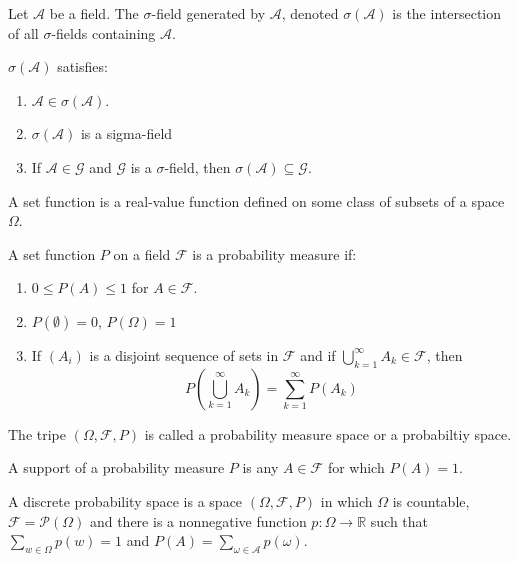 \documentclass[11pt]{article}
\newcommand{\R}{\mathbb{R}}
\newcommand{\F}{\mathcal{F}}
\newcommand{\A}{\mathcal{A}}
\newcommand{\seq}{\subseteq}
\newcommand{\es}{\emptyset}
\newcommand{\mc}{\mathcal}
\newenvironment{definition}[2][Definition]{\begin{trivlist}
\item[\hskip \labelsep {\bfseries #1}\hskip \labelsep {\bfseries #2.}]}{\end{trivlist}}
\newenvironment{rmrk}[2][Remark]{\begin{trivlist}
\item[\hskip \labelsep {\bfseries #1}\hskip \labelsep {\bfseries #2.}]}{\end{trivlist}}
\begin{document}
\begin{definition}{2}
    Let $\mc A$ be a field. The $\sigma$-field generated by $\mc A$, denoted $\sigma (\mc A)$ is the intersection of all $\sigma$-fields containing $\mc A$.
\end{definition}

\begin{rmrk}{3}
    $\sigma(\A)$ satisfies:
    \begin{enumerate}
        \item $\A \in \sigma(\A)$.
        \item $\sigma(\A)$ is a sigma-field
        \item If $\A \in \mc G$ and $\mc G$ is a $\sigma$-field, then $\sigma(\A) \seq \mc G$.
    \end{enumerate}
\end{rmrk}


\begin{definition}{4}
    A set function is a real-value function defined on some class of subsets of a space $\Omega$.
\end{definition}

\begin{definition}{5}
    A set function $P$ on a field $\F$ is a probability measure if:
    \begin{enumerate}
        \item $0 \leq P(A) \leq 1$ for $A \in \mc F$.
        \item $P(\es) = 0$, $P(\Omega) = 1$
        \item If $(A_i)$ is a disjoint sequence of sets in $\F$ and if $\bigcup_{k=1}^{\infty} A_k \in \F$, then
        \[ P \left ( \bigcup_{k=1}^{\infty} A_k \right) = \sum_{k=1}^{\infty} P(A_k) \]
    \end{enumerate}
    The tripe $(\Omega, \F, P)$ is called a probability measure space or a probabiltiy space.
\end{definition}

\begin{definition}{6}
    A support of a probability measure $P$ is any $A \in \F$ for which $P(A) = 1$.
\end{definition}

\begin{definition}{9}
    A discrete probability space is a space $(\Omega, \F, P)$ in which $\Omega$ is countable, $\F = \mc P (\Omega)$ and there is a nonnegative function $p: \Omega \to \R$ such that $\sum_{w \in \Omega} p(w) = 1$ and $P(A) = \sum_{\omega \in \A} p(\omega)$.
\end{definition}
\end{document}
